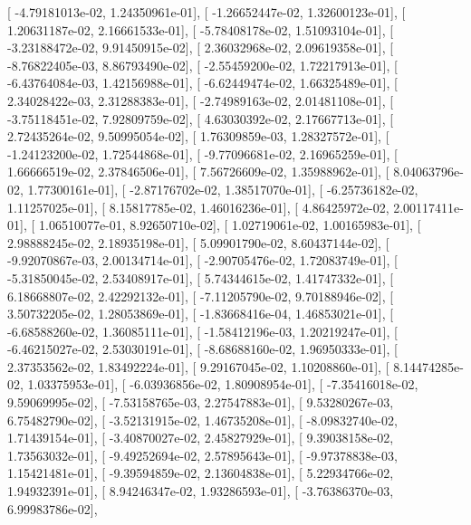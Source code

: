 \documentclass{article}
\begin{document}
       [ -4.79181013e-02,   1.24350961e-01],
       [ -1.26652447e-02,   1.32600123e-01],
       [  1.20631187e-02,   2.16661533e-01],
       [ -5.78408178e-02,   1.51093104e-01],
       [ -3.23188472e-02,   9.91450915e-02],
       [  2.36032968e-02,   2.09619358e-01],
       [ -8.76822405e-03,   8.86793490e-02],
       [ -2.55459200e-02,   1.72217913e-01],
       [ -6.43764084e-03,   1.42156988e-01],
       [ -6.62449474e-02,   1.66325489e-01],
       [  2.34028422e-03,   2.31288383e-01],
       [ -2.74989163e-02,   2.01481108e-01],
       [ -3.75118451e-02,   7.92809759e-02],
       [  4.63030392e-02,   2.17667713e-01],
       [  2.72435264e-02,   9.50995054e-02],
       [  1.76309859e-03,   1.28327572e-01],
       [ -1.24123200e-02,   1.72544868e-01],
       [ -9.77096681e-02,   2.16965259e-01],
       [  1.66666519e-02,   2.37846506e-01],
       [  7.56726609e-02,   1.35988962e-01],
       [  8.04063796e-02,   1.77300161e-01],
       [ -2.87176702e-02,   1.38517070e-01],
       [ -6.25736182e-02,   1.11257025e-01],
       [  8.15817785e-02,   1.46016236e-01],
       [  4.86425972e-02,   2.00117411e-01],
       [  1.06510077e-01,   8.92650710e-02],
       [  1.02719061e-02,   1.00165983e-01],
       [  2.98888245e-02,   2.18935198e-01],
       [  5.09901790e-02,   8.60437144e-02],
       [ -9.92070867e-03,   2.00134714e-01],
       [ -2.90705476e-02,   1.72083749e-01],
       [ -5.31850045e-02,   2.53408917e-01],
       [  5.74344615e-02,   1.41747332e-01],
       [  6.18668807e-02,   2.42292132e-01],
       [ -7.11205790e-02,   9.70188946e-02],
       [  3.50732205e-02,   1.28053869e-01],
       [ -1.83668416e-04,   1.46853021e-01],
       [ -6.68588260e-02,   1.36085111e-01],
       [ -1.58412196e-03,   1.20219247e-01],
       [ -6.46215027e-02,   2.53030191e-01],
       [ -8.68688160e-02,   1.96950333e-01],
       [  2.37353562e-02,   1.83492224e-01],
       [  9.29167045e-02,   1.10208860e-01],
       [  8.14474285e-02,   1.03375953e-01],
       [ -6.03936856e-02,   1.80908954e-01],
       [ -7.35416018e-02,   9.59069995e-02],
       [ -7.53158765e-03,   2.27547883e-01],
       [  9.53280267e-03,   6.75482790e-02],
       [ -3.52131915e-02,   1.46735208e-01],
       [ -8.09832740e-02,   1.71439154e-01],
       [ -3.40870027e-02,   2.45827929e-01],
       [  9.39038158e-02,   1.73563032e-01],
       [ -9.49252694e-02,   2.57895643e-01],
       [ -9.97378838e-03,   1.15421481e-01],
       [ -9.39594859e-02,   2.13604838e-01],
       [  5.22934766e-02,   1.94932391e-01],
       [  8.94246347e-02,   1.93286593e-01],
       [ -3.76386370e-03,   6.99983786e-02],
\end{document}
